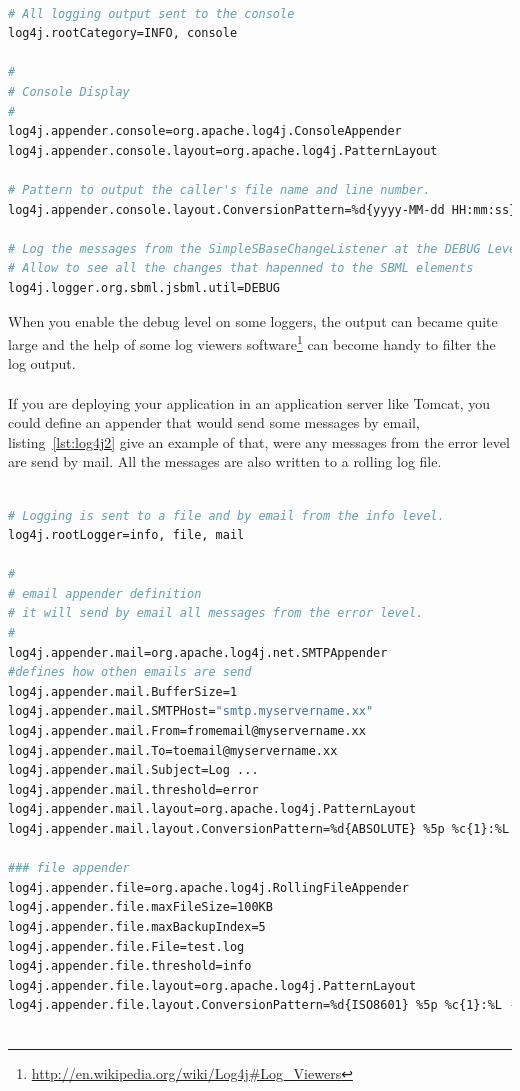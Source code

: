 \begin{lstlisting}[language=bash,numbers=none,caption={A simple  log4j example.},
label=lst:log4j1]

# All logging output sent to the console
log4j.rootCategory=INFO, console

#
# Console Display
#
log4j.appender.console=org.apache.log4j.ConsoleAppender
log4j.appender.console.layout=org.apache.log4j.PatternLayout

# Pattern to output the caller's file name and line number.
log4j.appender.console.layout.ConversionPattern=%d{yyyy-MM-dd HH:mm:ss} - %5p (%F:%L) - %m%n

# Log the messages from the SimpleSBaseChangeListener at the DEBUG Level
# Allow to see all the changes that hapenned to the SBML elements
log4j.logger.org.sbml.jsbml.util=DEBUG

\end{lstlisting}

When you enable the debug level on some loggers, the output can became quite large and
the help of some log viewers software\footnote{\url{http://en.wikipedia.org/wiki/Log4j\#Log_Viewers}}
 can become handy to filter the log output.

\paragraph{}If you are deploying your application in an application server like Tomcat, you could define
an appender that would send some messages by email, listing~\vref{lst:log4j2} give an example of that, were
any messages from the error level are send by mail. All the messages are also written to a rolling log file.

\begin{lstlisting}[language=bash,numbers=none,caption={SMTPAppender log4j example.},
label=lst:log4j2]

# Logging is sent to a file and by email from the info level.
log4j.rootLogger=info, file, mail

#
# email appender definition
# it will send by email all messages from the error level.
#
log4j.appender.mail=org.apache.log4j.net.SMTPAppender
#defines how othen emails are send
log4j.appender.mail.BufferSize=1
log4j.appender.mail.SMTPHost="smtp.myservername.xx"
log4j.appender.mail.From=fromemail@myservername.xx
log4j.appender.mail.To=toemail@myservername.xx
log4j.appender.mail.Subject=Log ...
log4j.appender.mail.threshold=error
log4j.appender.mail.layout=org.apache.log4j.PatternLayout
log4j.appender.mail.layout.ConversionPattern=%d{ABSOLUTE} %5p %c{1}:%L - %m%n

### file appender
log4j.appender.file=org.apache.log4j.RollingFileAppender
log4j.appender.file.maxFileSize=100KB
log4j.appender.file.maxBackupIndex=5
log4j.appender.file.File=test.log
log4j.appender.file.threshold=info
log4j.appender.file.layout=org.apache.log4j.PatternLayout
log4j.appender.file.layout.ConversionPattern=%d{ISO8601} %5p %c{1}:%L - %m%n
 

\end{lstlisting}

